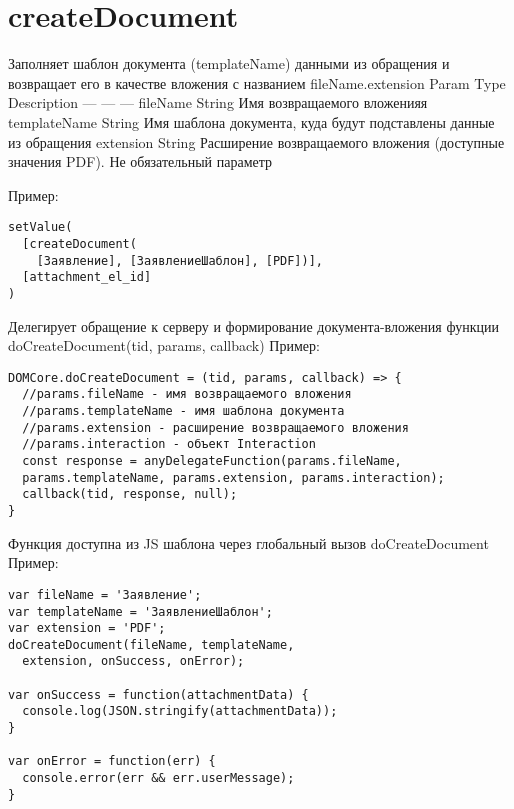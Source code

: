 \hypertarget{filename-templatename-extension}{%
\section{createDocument}\label{filename-templatename-extension}}

Заполняет шаблон документа (templateName) данными из обращения и
возвращает его в качестве вложения с названием fileName.extension
\textbar{} Param \textbar{} Type \textbar{} Description \textbar{}
\textbar{} --- \textbar{} --- \textbar{} --- \textbar{} \textbar{}
fileName \textbar{} String \textbar{} Имя возвращаемого вложенияя
\textbar{} \textbar{} templateName \textbar{} String \textbar{} Имя
шаблона документа, куда будут подставлены данные из обращения \textbar{}
\textbar{} extension \textbar{} String \textbar{} Расширение
возвращаемого вложения (доступные значения PDF). Не обязательный
параметр \textbar{}

Пример:

\begin{verbatim}
setValue(
  [createDocument(
    [Заявление], [ЗаявлениеШаблон], [PDF])], 
  [attachment_el_id]
)

\end{verbatim}

Делегирует обращение к серверу и формирование документа-вложения функции
doCreateDocument(tid, params, callback) Пример:

\begin{verbatim}
DOMCore.doCreateDocument = (tid, params, callback) => {
  //params.fileName - имя возвращаемого вложения
  //params.templateName - имя шаблона документа
  //params.extension - расширение возвращаемого вложения
  //params.interaction - объект Interaction
  const response = anyDelegateFunction(params.fileName, 
  params.templateName, params.extension, params.interaction);
  callback(tid, response, null);
}
\end{verbatim}

Функция доступна из JS шаблона через глобальный вызов doCreateDocument
Пример:

\begin{verbatim}
var fileName = 'Заявление';
var templateName = 'ЗаявлениеШаблон';
var extension = 'PDF';
doCreateDocument(fileName, templateName, 
  extension, onSuccess, onError);

var onSuccess = function(attachmentData) {
  console.log(JSON.stringify(attachmentData));
}

var onError = function(err) {
  console.error(err && err.userMessage);
}
\end{verbatim}

